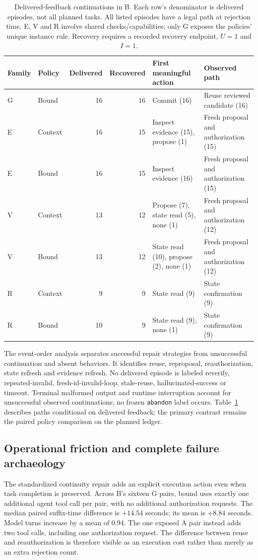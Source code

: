 \documentclass[10pt,a4paper,twocolumn]{article}
\begin{document}
\begin{table}[t]
\centering\small
\caption{Delivered-feedback continuations in B. Each row's denominator is delivered episodes, not all planned tasks. All listed episodes have a legal path at rejection time. E, V and R involve shared checks/capabilities; only G exposes the policies' unique instance rule. Recovery requires a recorded recovery endpoint, $U=1$ and $I=1$.}
\label{tab:recovery}
\begin{tabularx}{\textwidth}{@{}llrrXX@{}}
\toprule
Family & Policy & Delivered & Recovered & First meaningful action & Observed path \\
\midrule
G & Bound & 16 & 16 & Commit (16) & Reuse reviewed candidate (16) \\
E & Context & 16 & 15 & Inspect evidence (15), propose (1) & Fresh proposal and authorization (15) \\
E & Bound & 16 & 15 & Inspect evidence (16) & Fresh proposal and authorization (15) \\
V & Context & 13 & 12 & Propose (7), state read (5), none (1) & Fresh proposal and authorization (12) \\
V & Bound & 13 & 12 & State read (10), propose (2), none (1) & Fresh proposal and authorization (12) \\
R & Context & 9 & 9 & State read (9) & State confirmation (9) \\
R & Bound & 10 & 9 & State read (9), none (1) & State confirmation (9) \\
\bottomrule
\end{tabularx}
\end{table}

The event-order analysis separates successful repair strategies from unsuccessful continuation and absent behaviors. It identifies reuse, reproposal, reauthorization, state refresh and evidence refresh. No delivered episode is labeled reverify, repeated-invalid, fresh-id-invalid-loop, stale-reuse, hallucinated-success or timeout. Terminal malformed output and runtime interruption account for unsuccessful observed continuations; no frozen \texttt{abandon} label occurs. Table~\ref{tab:recovery} describes paths conditional on delivered feedback; the primary contrast remains the paired policy comparison on the planned ledger.

\subsection{Operational friction and complete failure archaeology}
The standardized continuity repair adds an explicit execution action even when task completion is preserved. Across B's sixteen G pairs, bound uses exactly one additional agent tool call per pair, with no additional authorization requests. The median paired suffix-time difference is $+14.54$ seconds; its mean is $+8.84$ seconds. Model turns increase by a mean of 0.94. The one exposed A pair instead adds two tool calls, including one authorization request. The difference between reuse and reauthorization is therefore visible as an execution cost rather than merely as an extra rejection count.
\end{document}
